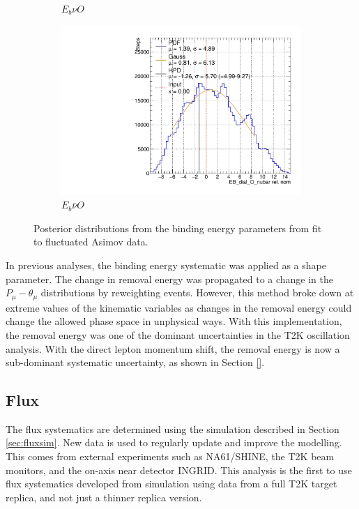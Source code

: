 \begin{figure}[t]
\begin{subfigure}{.48\textwidth}
  \caption{$E_{b}\nu O$}
\end{subfigure}
\begin{subfigure}{.48\textwidth}
  \centering
  \includegraphics[width=0.73\linewidth]{figs/EB_dial_O_nubarFluc}
  \caption{$E_{b}\bar{\nu}O$}
\end{subfigure}
\caption{Posterior distributions from the binding energy parameters from fit to fluctuated Asimov data.}
\label{fig:Ebdata}
\end{figure}

In previous analyses, the binding energy systematic was applied as a shape parameter. The change in removal energy was propagated to a change in the $P_{\mu}-\theta_{\mu}$ distributions by reweighting events. However, this method broke down at extreme values of the kinematic variables as changes in the removal energy could change the allowed phase space in unphysical ways. With this implementation, the removal energy was one of the dominant uncertainties in the T2K oscillation analysis. With the direct lepton momentum shift, the removal energy is now a sub-dominant systematic uncertainty, as shown in Section \ref{}.

\subsection{Flux}\label{sec:beam}

The flux systematics are determined using the simulation described in Section \ref{sec:fluxsim}. New data is used to regularly update and improve the modelling. This comes from external experiments such as NA61/SHINE\cite{na61}, the T2K beam monitors, and the on-axis near detector INGRID. This analysis is the first to use flux systematics developed from simulation using data from a full T2K target replica, and not just a thinner replica version.

